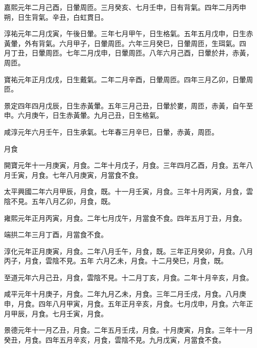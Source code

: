 \begin{pinyinscope}
 嘉熙元年二月己酉，日暈周匝。三月癸亥、七月壬申，日有背氣。四年二月丙申朔，日生背氣。辛丑，白虹貫日。



 淳祐元年二月戊寅，午後日暈。三年七月甲午，日生格氣。五年五月戊申，日生赤黃暈，外有背氣。六月甲子，日暈周匝。六年三月癸巳，日暈周匝，生珥氣。四
 月丁丑，日暈周匝。七年二月戊申，日暈周匝。八年六月己酉，日暈於井，赤黃，周匝。



 寶祐元年正月戊戌，日生戴氣。二年二月辛酉，日暈周匝。四年三月乙卯，日暈周匝。



 景定四年四月戊辰，日生赤黃暈。五年三月己丑，日暈於婁，周匝，赤黃，自午至申。六月庚午，日生赤黃暈。九月己丑，日生格氣。



 咸淳元年六月壬午，日生承氣。七年春三月辛巳，日暈，赤黃，周匝。



 月食



 開寶元年十一月庚寅，月食。二年十月戊子，月食。三年四月乙酉，月食。五年八月壬寅，月食。七年八月庚寅，月當食不食。



 太平興國二年六月甲辰，月食，既。十一月壬寅，月食。三年十月丙寅，月食，雲陰不見。五年八月乙卯，月食，既。



 雍熙元年正月丙寅，月食。二年七月戊午，月當食不食。四年五月丁丑，月食。



 端拱二年三月丁酉，月當食不食。



 淳化元年正月庚寅，月食。二年八月壬午，月食，既。三年正月癸卯，月食。八月丙子，月食，雲陰不見。五年
 六月乙未，月食。十二月癸巳，月食，既。



 至道元年六月己丑，月食，雲陰不見。十二月丁亥，月食。二年十月辛亥，月食。



 咸平元年十月庚子，月食。二年九月乙未，月食。三年二月壬戌，月食。八月庚申，月食。四年八月甲寅，月食。五年正月辛亥，月食。七月戊申，月食。六年正月甲辰，月食。七月壬寅，月食。



 景德元年十一月乙丑，月食。二年五月壬戌，月食。十月庚寅，月食。三年十一月癸丑，月食。四年五月辛亥，月食，雲陰不見。九月戊寅，月當食不食。




\end{pinyinscope}
